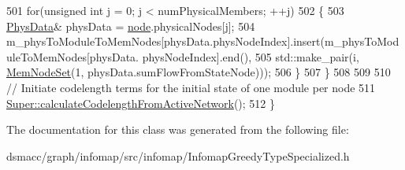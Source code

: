 \begin{DoxyCode}
501         \textcolor{keywordflow}{for}(\textcolor{keywordtype}{unsigned} \textcolor{keywordtype}{int} j = 0; j < numPhysicalMembers; ++j)
502         \{
503             \mbox{\hyperlink{structPhysData}{PhysData}}& physData = \mbox{\hyperlink{structnode}{node}}.physicalNodes[j];
504             m\_physToModuleToMemNodes[physData.physNodeIndex].insert(m\_physToModuleToMemNodes[physData.
      physNodeIndex].end(),
505                     std::make\_pair(i, \mbox{\hyperlink{structMemNodeSet}{MemNodeSet}}(1, physData.sumFlowFromStateNode)));
506         \}
507     \}
508 
509 
510     \textcolor{comment}{// Initiate codelength terms for the initial state of one module per node}
511     \mbox{\hyperlink{classInfomapGreedyCommon_ae168ab41c18759e09b1a3dff97ee017d}{Super::calculateCodelengthFromActiveNetwork}}();
512 \}
\end{DoxyCode}


The documentation for this class was generated from the following file\+:\begin{DoxyCompactItemize}
\item 
dsmacc/graph/infomap/src/infomap/Infomap\+Greedy\+Type\+Specialized.\+h\end{DoxyCompactItemize}
